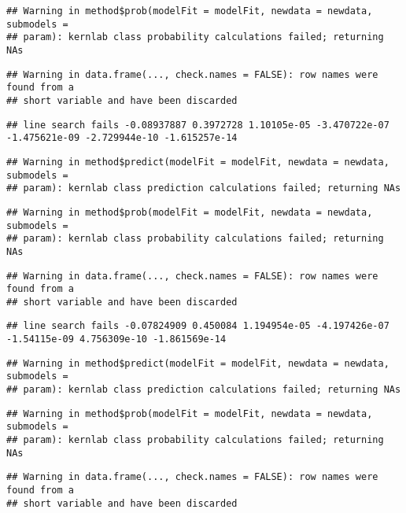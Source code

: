 \documentclass[
]{article}
\begin{document}
\begin{verbatim}
## Warning in method$prob(modelFit = modelFit, newdata = newdata, submodels =
## param): kernlab class probability calculations failed; returning NAs
\end{verbatim}

\begin{verbatim}
## Warning in data.frame(..., check.names = FALSE): row names were found from a
## short variable and have been discarded
\end{verbatim}

\begin{verbatim}
## line search fails -0.08937887 0.3972728 1.10105e-05 -3.470722e-07 -1.475621e-09 -2.729944e-10 -1.615257e-14
\end{verbatim}

\begin{verbatim}
## Warning in method$predict(modelFit = modelFit, newdata = newdata, submodels =
## param): kernlab class prediction calculations failed; returning NAs
\end{verbatim}

\begin{verbatim}
## Warning in method$prob(modelFit = modelFit, newdata = newdata, submodels =
## param): kernlab class probability calculations failed; returning NAs
\end{verbatim}

\begin{verbatim}
## Warning in data.frame(..., check.names = FALSE): row names were found from a
## short variable and have been discarded
\end{verbatim}

\begin{verbatim}
## line search fails -0.07824909 0.450084 1.194954e-05 -4.197426e-07 -1.54115e-09 4.756309e-10 -1.861569e-14
\end{verbatim}

\begin{verbatim}
## Warning in method$predict(modelFit = modelFit, newdata = newdata, submodels =
## param): kernlab class prediction calculations failed; returning NAs
\end{verbatim}

\begin{verbatim}
## Warning in method$prob(modelFit = modelFit, newdata = newdata, submodels =
## param): kernlab class probability calculations failed; returning NAs
\end{verbatim}

\begin{verbatim}
## Warning in data.frame(..., check.names = FALSE): row names were found from a
## short variable and have been discarded
\end{verbatim}
\end{document}

